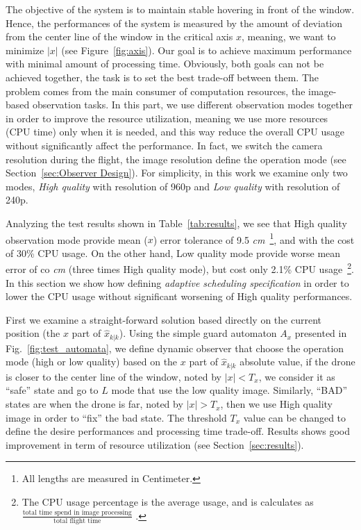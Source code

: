 \documentclass{sig-alternate-ipsn13}
\begin{document}
The objective of the system is to maintain stable hovering in front of the window. Hence, the performances of the system is measured by the amount of deviation from the center line of the window in the critical axis $x$, meaning, we want to minimize $|x|$ (see Figure~\ref{fig:axis}). Our goal is to achieve maximum performance with minimal amount of processing time. Obviously, both goals can not be achieved together, the task is to set the best trade-off between them. The problem comes from the main consumer of computation resources, the image-based observation tasks.
In this part, we use different observation modes together in order to improve the resource utilization, meaning we use more resources (CPU time) only when it is needed, and this way reduce the overall CPU usage without significantly affect the performance.
In fact, we switch the camera resolution during the flight, the image resolution define the operation mode (see Section~\ref{sec:Observer Design}).
For simplicity, in this work we examine only two modes, \textit{High quality} with resolution of 960p and \textit{Low quality} with resolution of 240p.

Analyzing the test results shown in Table~\ref{tab:results}, we see that High quality observation mode provide mean ($x$) error tolerance of 9.5 \textit{cm}~\footnote{All lengths are measured in Centimeter.}, and with the cost of 30\% CPU usage.
On the other hand, Low quality mode provide worse mean error of co \textit{cm} (three times High quality mode), but cost only 2.1\% CPU usage~\footnote{The CPU usage percentage is the average usage, and is calculates as $\frac{\text{total time spend in image processing}}{\text{total flight time}}$ . }.
In this section we show how defining \textit{adaptive scheduling specification} in order to lower the CPU usage without significant worsening of High quality performances.

First we examine a straight-forward solution based directly on the current position (the $x$ part of $\hat{x}_{k|k}$). Using the simple guard automaton $A_{x}$ presented in Fig.~\ref{fig:test_automata}, we define dynamic observer that choose the operation mode (high or low quality) based on the $x$ part of $\hat{x}_{k|k}$ absolute value, if the drone is closer to the center line of the window, noted by $|x| < T_x$, we consider it as ``safe'' state and go to $L$ mode that use the low quality image.
Similarly, ``BAD'' states are when the drone is far, noted by $|x| > T_x$, then we use High quality image in order to ``fix'' the bad state.
The threshold $T_x$ value can be changed to define the desire performances and processing time trade-off.
Results shows good improvement in term of resource utilization (see Section~\ref{sec:results}). 
\end{document}
